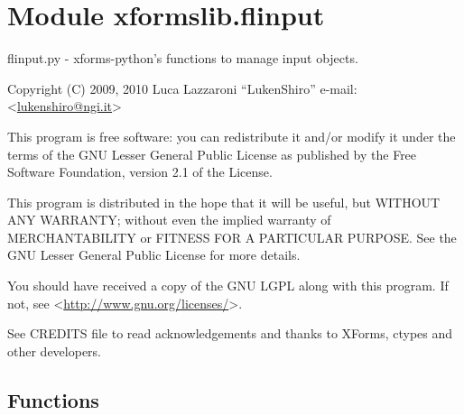 %
%
%


\section{Module xformslib.flinput}

    \label{xformslib:flinput}

flinput.py - xforms-python's functions to manage input objects.

Copyright (C) 2009, 2010  Luca Lazzaroni ``LukenShiro''
e-mail: <\href{mailto:lukenshiro@ngi.it}{lukenshiro@ngi.it}>

This program is free software: you can redistribute it and/or modify
it under the terms of the GNU Lesser General Public License as
published by the Free Software Foundation, version 2.1 of the License.

This program is distributed in the hope that it will be useful,
but WITHOUT ANY WARRANTY; without even the implied warranty of
MERCHANTABILITY or FITNESS FOR A PARTICULAR PURPOSE. See the
GNU Lesser General Public License for more details.

You should have received a copy of the GNU LGPL along with this
program. If not, see <\href{http://www.gnu.org/licenses/}{http://www.gnu.org/licenses/}>.

See CREDITS file to read acknowledgements and thanks to XForms,
ctypes and other developers.


  \subsection{Functions}

    \label{xformslib:flinput:fl_add_input}

